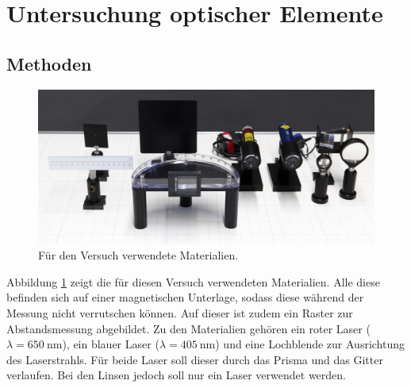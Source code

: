 \section{Untersuchung optischer Elemente}
	
	\subsection{Methoden}
		
			\begin{figure}[ht]
				\centering
				\includegraphics[width=\textwidth]{bilder/aufbau2.jpg}
			 	\caption{Für den Versuch verwendete Materialien.\cite{WWU}}
			 	\label{fig:Aufbau2}	
			\end{figure}
			Abbildung \ref{fig:Aufbau2} zeigt die für diesen Versuch verwendeten Materialien.
			Alle diese befinden sich auf einer magnetischen Unterlage, sodass diese während der Messung nicht verrutschen können.
			Auf dieser ist zudem ein Raster zur Abstandsmessung abgebildet.
			Zu den Materialien gehören ein roter Laser ($\lambda = \SI{650}{\nano\meter}$), ein blauer Laser ($\lambda = \SI{405}{\nano\meter}$) und eine Lochblende zur Ausrichtung des Laserstrahls.
			Für beide Laser soll dieser durch das Prisma und das Gitter verlaufen. 
			Bei den Linsen jedoch soll nur ein Laser verwendet werden.
			
